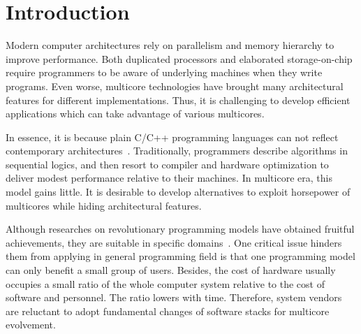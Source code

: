 \section{Introduction}\label{sec:Intro}
Modern computer architectures rely on parallelism and memory
hierarchy to improve performance. Both duplicated processors and
elaborated storage-on-chip require programmers to be aware of underlying
machines when they write programs. Even worse,
multicore technologies have brought many architectural features for
different implementations. Thus, it is challenging to develop
efficient applications which can take advantage of various multicores.

In essence, it is because plain C/C++ programming languages
can not reflect contemporary architectures~\cite{cml}. Traditionally, programmers
describe algorithms in sequential logics, and then resort to  compiler
and hardware optimization to deliver modest performance relative to
their machines. In multicore era, this model gains
little. It is desirable to develop alternatives to exploit horsepower
of multicores while hiding architectural features.

Although researches on revolutionary programming models have obtained
fruitful achievements, they are suitable in specific
domains~\cite{gmapreduce, erlang, haskell}.
One critical issue hinders them from applying in general programming
field is that one programming model can only
benefit a small group of users. Besides, the cost of hardware
usually occupies a small ratio of the whole computer system relative
to the cost of software and
personnel. The ratio lowers with time. Therefore, system vendors are
reluctant to adopt fundamental changes of software stacks for
multicore evolvement.


